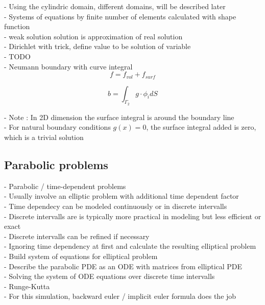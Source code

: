 \documentclass[parskip=half, titlepage=yes, 12pt, BCOR=12mm, DIV=calc]{scrartcl}
\begin{document}
- Using the cylindric domain, different domains, will be described later \\


- Systems of equations by finite number of elements calculated with shape function \\
- weak solution solution is approximation of real solution \\


- Dirichlet with trick, define value to be solution of variable \\
- TODO \\


- Neumann boundary with curve integral \\
\begin{equation}
    f = f_{vol} + f_{surf}
\end{equation}

\begin{equation}
    b = \int_{\Gamma_2} g \cdot \phi_{i} d S 
\end{equation}

- Note : In 2D dimension the surface integral is around the boundary line \\
- For natural boundary conditions $g(x) = 0$, the surface integral added is zero, which is a trivial solution \\

\subsection{Parabolic problems}
- Parabolic / time-dependent problems \\
- Usually involve an elliptic problem with additional time dependent factor \\

- Time dependecy can be modeled continuously or in discrete intervalls \\
- Discrete intervalls are is typically more practical in modeling but less efficient or exact \\
- Discrete intervalls can be refined if necessary \\

- Ignoring time dependency at first and calculate the resulting elliptical problem \\
- Build system of equations for elliptical problem \\

- Describe the parabolic PDE as an ODE with matrices from elliptical PDE \\
- Solving the system of ODE equations over discrete time intervalls \\
- Runge-Kutta \\
- For this simulation, backward euler / implicit euler formula does the job \\
\end{document}
